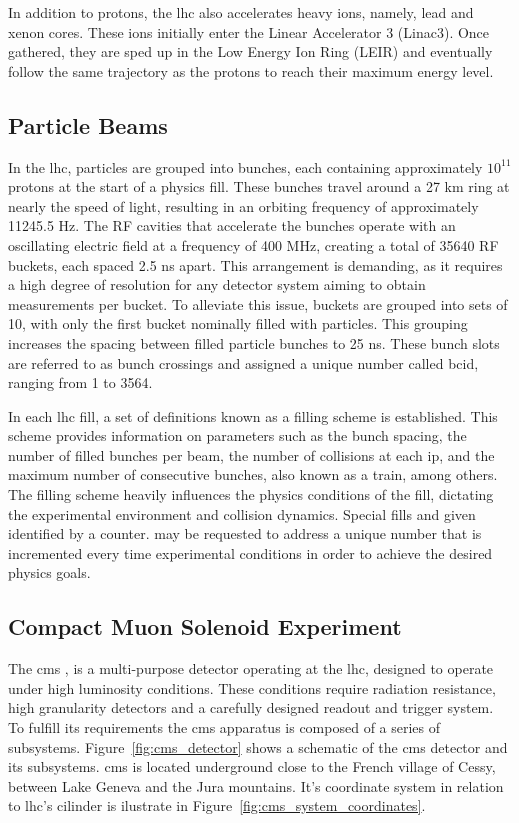 In addition to protons, the \acrshort{lhc} also accelerates heavy ions, namely, lead and xenon cores. These ions initially enter the Linear Accelerator 3 (Linac3). Once gathered, they are sped up in the Low Energy Ion Ring (LEIR) and eventually follow the same trajectory as the protons to reach their maximum energy level.


\subsection{Particle Beams}
\label{subsec:particle_beams_lhc}

In the \acrshort{lhc}, particles are grouped into bunches, each containing approximately $10^{11}$ protons at the start of a physics fill. These bunches travel around a 27 km ring at nearly the speed of light, resulting in an orbiting frequency of approximately 11245.5 Hz. The RF cavities that accelerate the bunches operate with an oscillating electric field at a frequency of 400 MHz, creating a total of 35640 RF buckets, each spaced 2.5 ns apart. This arrangement is demanding, as it requires a high degree of resolution for any detector system aiming to obtain measurements per bucket. To alleviate this issue, buckets are grouped into sets of 10, with only the first bucket nominally filled with particles. This grouping increases the spacing between filled particle bunches to 25 ns. These bunch slots are referred to as bunch crossings and assigned a unique number called \acrfull{bcid}, ranging from 1 to 3564.

In each \acrshort{lhc} fill, a set of definitions known as a filling scheme is established. This scheme provides information on parameters such as the bunch spacing, the number of filled bunches per beam, the number of collisions at each \acrshort{ip}, and the maximum number of consecutive bunches, also known as a train, among others. The filling scheme heavily influences the physics conditions of the fill, dictating the experimental environment and collision dynamics. Special fills and given identified by a counter. may be requested to address a unique number that is incremented every time  experimental conditions in order to achieve the desired physics goals.


\subsection{Compact Muon Solenoid Experiment}
\label{subsec:cms}

The \acrlong{cms} \cite{TheCMSCollaboration_2008}, is a multi-purpose detector operating at the \acrshort{lhc}, designed to operate under high luminosity conditions. These conditions require radiation resistance, high granularity detectors and a carefully designed readout and trigger system. To fulfill its requirements the \acrshort{cms} apparatus is composed of a series of subsystems. Figure~\ref{fig:cms_detector} shows a schematic of the \acrshort{cms} detector and its subsystems. \acrshort{cms} is located underground close to the French village of Cessy, between Lake Geneva and the Jura mountains. It's coordinate system in relation to \acrshort{lhc}'s cilinder is ilustrate in Figure~\ref{fig:cms_system_coordinates}.

